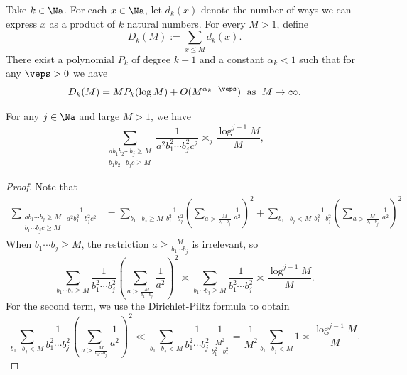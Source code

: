 \documentclass[12pt,a4paper]{amsart}
\begin{document}
\begin{lem01}
Take $k\in\Na$. For each $x\in \Na$, let $d_k(x)$ denote the number of ways we can express $x$ as a product of $k$ natural numbers. For every $M>1$, define
\[
D_k(M):= \sum_{x\leq M} d_k(x).
\]
There exist a polynomial $P_k$ of degree $k-1$ and a constant $\alpha_k<1$ such that for any $\veps>0$ we have
\[
D_k(M)
=
MP_k(\log M) + O(M^{\alpha_k+\veps})
\;\text{ as }\; M\to\infty.
\]
\end{lem01}
\begin{lem01}
For any $j\in\Na$ and large $M>1$, we have
\[
    \sum_{\substack{ab_1b_2\cdots b_j\geq M \\ b_1b_2\cdots b_jc\geq M}} 
    \frac{1}{a^2b_1^2\cdots b_j^2c^2}
    \asymp_{j}
    \frac{\log^{j-1} M}{M}, \label{Eq:01:01} 
\]
\end{lem01}
\begin{proof}
 Note that 
\begin{align*}
\sum_{\substack{ab_1\cdots b_j\geq M \\ b_1\cdots b_jc\geq M}} \frac{1}{a^2b_1^2\cdots b_j^2c^2}
&=
\sum_{b_1\cdots b_j\geq M} 
\frac{1}{b_1^2\cdots b_j^2}
\left( \sum_{a> \frac{M}{b_1\cdots b_j}} \frac{1}{a^2}\right)^2
+
\sum_{b_1\cdots b_j< M} 
\frac{1}{b_1^2\cdots b_j^2}
\left( \sum_{a> \frac{M}{b_1\cdots b_j}} \frac{1}{a^2}\right)^2
\end{align*}
When $b_1\cdots b_j\geq M$, the restriction $a \geq  \frac{M}{b_1\cdots b_j}$ is irrelevant, so
\[
\sum_{b_1\cdots b_j\geq M} 
\frac{1}{b_1^2\cdots b_j^2}
\left( \sum_{a> \frac{M}{b_1\cdots b_j}} \frac{1}{a^2}\right)^2
\asymp
\sum_{b_1\cdots b_j\geq M} 
\frac{1}{b_1^2\cdots b_j^2}
\asymp
\frac{\log^{j-1} M}{M}.
\]
For the second term, we use the Dirichlet-Piltz formula to obtain
\[
\sum_{b_1\cdots b_j< M} 
\frac{1}{b_1^2\cdots b_j^2}
\left( \sum_{a> \frac{M}{b_1\cdots b_j}} \frac{1}{a^2}\right)^2
\ll 
\sum_{b_1\cdots b_j< M} 
\frac{1}{b_1^2\cdots b_j^2}
\frac{1}{\frac{M^2}{b_1^2\cdots b_j^2}}
=
\frac{1}{M^2}
\sum_{b_1\cdots b_j< M} 
1
\asymp
\frac{\log^{j-1} M}{M}.
\]
\end{proof}
\end{document}
